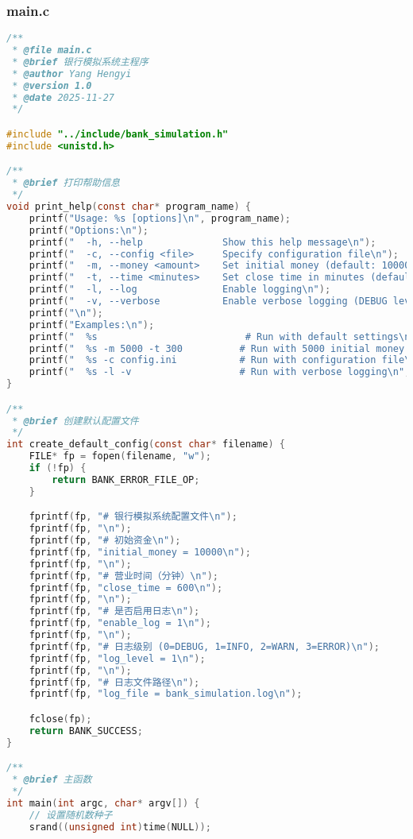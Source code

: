 \documentclass[12pt,a4paper]{article}
\begin{document}
\subsubsection{main.c}
\begin{lstlisting}[language=C,caption=main.c]
/**
 * @file main.c
 * @brief 银行模拟系统主程序
 * @author Yang Hengyi
 * @version 1.0
 * @date 2025-11-27
 */

#include "../include/bank_simulation.h"
#include <unistd.h>

/**
 * @brief 打印帮助信息
 */
void print_help(const char* program_name) {
    printf("Usage: %s [options]\n", program_name);
    printf("Options:\n");
    printf("  -h, --help              Show this help message\n");
    printf("  -c, --config <file>     Specify configuration file\n");
    printf("  -m, --money <amount>    Set initial money (default: 10000)\n");
    printf("  -t, --time <minutes>    Set close time in minutes (default: 600)\n");
    printf("  -l, --log               Enable logging\n");
    printf("  -v, --verbose           Enable verbose logging (DEBUG level)\n");
    printf("\n");
    printf("Examples:\n");
    printf("  %s                          # Run with default settings\n", program_name);
    printf("  %s -m 5000 -t 300          # Run with 5000 initial money and 300 minutes\n", program_name);
    printf("  %s -c config.ini           # Run with configuration file\n", program_name);
    printf("  %s -l -v                   # Run with verbose logging\n", program_name);
}

/**
 * @brief 创建默认配置文件
 */
int create_default_config(const char* filename) {
    FILE* fp = fopen(filename, "w");
    if (!fp) {
        return BANK_ERROR_FILE_OP;
    }

    fprintf(fp, "# 银行模拟系统配置文件\n");
    fprintf(fp, "\n");
    fprintf(fp, "# 初始资金\n");
    fprintf(fp, "initial_money = 10000\n");
    fprintf(fp, "\n");
    fprintf(fp, "# 营业时间（分钟）\n");
    fprintf(fp, "close_time = 600\n");
    fprintf(fp, "\n");
    fprintf(fp, "# 是否启用日志\n");
    fprintf(fp, "enable_log = 1\n");
    fprintf(fp, "\n");
    fprintf(fp, "# 日志级别 (0=DEBUG, 1=INFO, 2=WARN, 3=ERROR)\n");
    fprintf(fp, "log_level = 1\n");
    fprintf(fp, "\n");
    fprintf(fp, "# 日志文件路径\n");
    fprintf(fp, "log_file = bank_simulation.log\n");

    fclose(fp);
    return BANK_SUCCESS;
}

/**
 * @brief 主函数
 */
int main(int argc, char* argv[]) {
    // 设置随机数种子
    srand((unsigned int)time(NULL));


\end{lstlisting}
\end{document}
